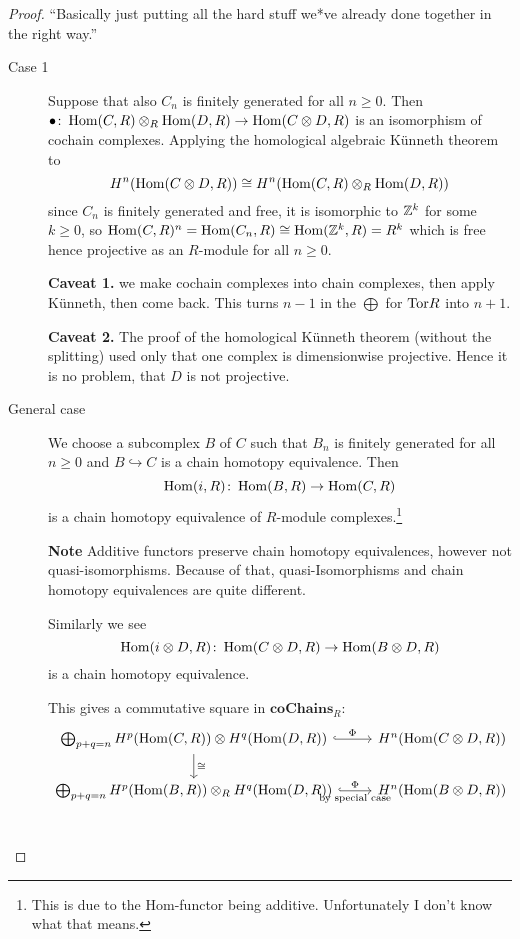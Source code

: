 \documentclass[language=english]{TemplateLecture}
\begin{document}
\begin{proof}
    \enquote{Basically just putting all the hard stuff we*ve already done together in the right way.}
    \begin{description}
        \item[Case 1] Suppose that also \(C_n\) is finitely generated for all \(n \geq 0\). Then \(\bullet \colon \operatorname{Hom}(C,R) \otimes _R \operatorname{Hom}(D,R) \to \operatorname{Hom}(C\otimes D, R)\) is an isomorphism of cochain complexes. Applying the homological algebraic Künneth theorem to
        \[H^n(\operatorname{Hom}(C\otimes D,R)) \cong H^n(\operatorname{Hom}(C,R) \otimes_R \operatorname{Hom}(D,R))\]
        since \(C_n\) is finitely generated and free, it is isomorphic to \(\mathbb{Z}^k\) for some \(k \geq 0\), so \(\operatorname{Hom}(C,R)^n = \operatorname{Hom}(C_n,R) \cong \operatorname{Hom}(\mathbb{Z}^k, R) = R^k\) which is free hence projective as an \(R\)-module for all \(n \geq 0\).

        \textbf{Caveat 1.} we make cochain complexes into chain complexes, then apply Künneth, then come back. This turns \(n-1\) in the \(\bigoplus\) for \(\mathrm{Tor} R\) into \(n+1\).

        \textbf{Caveat 2.} The proof of the homological Künneth theorem (without the splitting) used only that one complex is dimensionwise projective. Hence it is no problem, that \(D\) is not projective.

        \item[General case] We choose a subcomplex \(B\) of \(C\) such that \(B_n\) is finitely generated for all \(n \geq 0\) and \(B \hookrightarrow C\) is a chain homotopy equivalence. Then
        \[\operatorname{Hom}(i, R) \colon \operatorname{Hom}(B,R) \to \operatorname{Hom}(C,R)\]
        is a chain homotopy equivalence of \(R\)-module complexes.\footnote{This is due to the Hom-functor being additive. Unfortunately I don't know what that means.}
        
        \textbf{Note} Additive functors preserve chain homotopy equivalences, however not quasi-isomorphisms. Because of that, quasi-Isomorphisms and chain homotopy equivalences are quite different.

        Similarly we see
        \[\operatorname{Hom}(i\otimes D, R) \colon \operatorname{Hom}(C\otimes D, R) \to \operatorname{Hom}(B\otimes D, R)\]
        is a chain homotopy equivalence.

        This gives a commutative square in \(\mathbf{coChains}_R\):
        \[\begin{tikzcd}
            {\bigoplus_{p+q = n} H^p(\Hom(C,R)) \otimes H^q(\Hom(D,R))} \ar[r, hook, "\Phi"] \ar[d, "\cong"] & {H^n(\Hom(C\otimes D, R))} \\
            {\bigoplus_{p+q = n} H^p(\Hom(B,R)) \otimes_R H^q(\Hom(D,R))} \ar[r, hook, "\Phi", "\text{by special case}"'] & {H^n(\Hom(B\otimes D, R))} \\
        \end{tikzcd}\]
    \end{description}
\end{proof}
\end{document}
